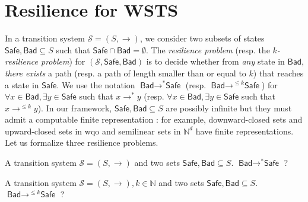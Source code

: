 %

\fi




\newcommand{\Bad}{\textsf{Bad}}
\newcommand{\Safe}{\textsf{Safe}}



\section{Resilience for WSTS}

In a transition system $\mathscr{S}=(S,\rightarrow)$, we consider two subsets of states $\Safe, \Bad \subseteq S$ such that $\Safe \cap  \Bad = \emptyset$.
The \emph{resilience problem} (resp. the \emph{$k$-resilience problem}) for $(\mathscr{S},\Safe,\Bad)$ is to decide whether from \emph{any} state in $\Bad$, \emph{there exists} a path (resp. a path of length smaller than or equal to $k$) that reaches a state in $\Safe$. We use the notation $\Bad \longrightarrow^{*} \Safe$ (resp. $\Bad \longrightarrow^{\leq k} \Safe$) for $\forall x \in \Bad, \exists y \in \Safe$ such that $x \longrightarrow^{*} y$ (resp.  $\forall x \in \Bad, \exists y \in \Safe$ such that $x \longrightarrow^{\leq k} y$). In our framework, $\Safe, \Bad \subseteq S$  are possibly infinite but they must admit a computable finite representation : for example, downward-closed sets and upward-closed sets in wqo and semilinear sets in $\mathbb{N}^d$ have finite representations. 
Let us formalize three resilience problems.

{A transition system $\mathscr{S}=(S,\rightarrow)$ and two sets $\Safe, \Bad \subseteq S$.}
{$\Bad \longrightarrow^{*} \Safe$ ?\newline}
%

%

{A transition system $\mathscr{S}=(S,\rightarrow), k \in \mathbb{N}$ and two sets $\Safe, \Bad \subseteq S$.}
{$\Bad \longrightarrow^{\leq k} \Safe$ ?\newline}

